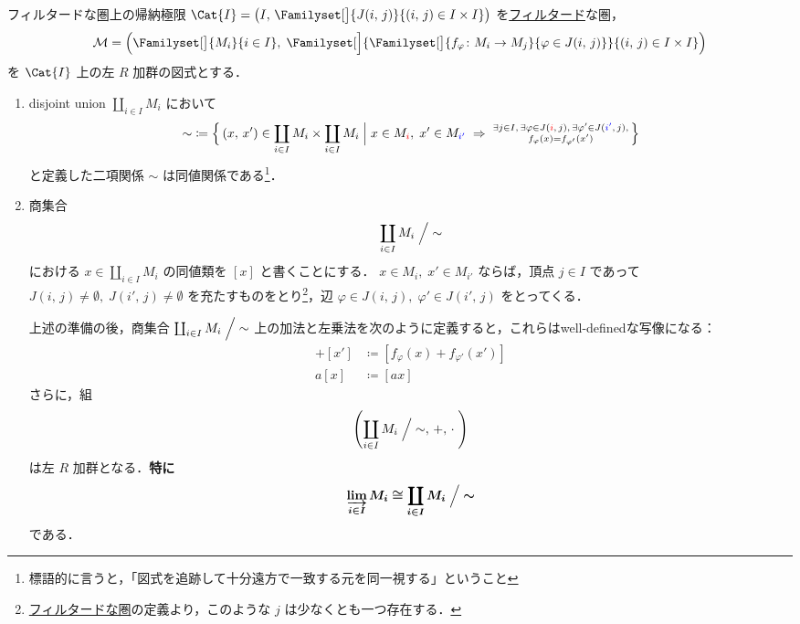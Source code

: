 \documentclass[algtopo_main]{subfiles}
\begin{document}
\begin{myprop}[label=prop:indlim-f, breakable]{フィルタードな圏上の帰納極限}
	$\Cat{I} = \bigl( I,\, \Familyset[\big]{J(i,\, j)}{(i,\, j) \in I \times I} \bigr) $ を\hyperref[def:filtered]{フィルタード}な圏，
	\begin{align}
		\mathcal{M} = \Bigl( \Familyset[\big]{M_i}{i \in I},\; \Familyset[\Big]{\Familyset[\big]{f_\varphi \colon M_i \to M_j}{\varphi \in J(i,\, j)}}{(i,\, j) \in I \times I} \Bigr)
	\end{align}
	を $\Cat{I}$ 上の左 $R$ 加群の図式とする．
	\begin{enumerate}
		\item disjoint union $\coprod_{i \in I} M_i$ において
		\begin{align}
			\sim \; \coloneqq \Bigl\{\, (x,\, x') \in \coprod_{i \in I} M_i \times \coprod_{i \in I} M_i \Bigm| x \in M_{\textcolor{red}{i}},\; x' \in M_{\textcolor{blue}{i'}}\; \Rightarrow\; \substack{\exists j \in I,\,\exists \varphi \in J(\textcolor{red}{i},\, j),\, \exists \varphi' \in J(\textcolor{blue}{i'},\, j),\\ f_\varphi(x) = f_{\varphi'}(x')} \,\Bigr\} 
		\end{align}
		と定義した二項関係 $\sim$ は同値関係である\footnote{標語的に言うと，「図式を追跡して十分遠方で一致する元を同一視する」ということ}．
		\item 商集合
		\begin{align}
			\coprod_{i \in I} M_i \Bigm/ {\sim}
		\end{align}
		における $x \in \coprod_{i \in I} M_i$ の同値類を $[x]$ と書くことにする．
		$x \in M_i,\; x' \in M_{i'}$ ならば，頂点 $j \in I$ であって $J(i,\, j) \neq \emptyset,\; J(i',\, j) \neq \emptyset$ を充たすものをとり\footnote{\hyperref[def:filtered]{フィルタードな圏}の定義より，このような $j$ は少なくとも一つ存在する．}，辺 $\varphi \in J(i,\, j),\; \varphi' \in J(i',\, j)$ をとってくる．

		上述の準備の後，商集合 $\coprod_{i \in I} M_i \Bigm/ {\sim}$ 上の加法と左乗法を次のように定義すると，これらはwell-definedな写像になる：
		\begin{align}
			[x] + [x'] & \coloneqq [f_\varphi(x) + f_{\varphi'}(x')] \\
			a[x] &\coloneqq [ax]
		\end{align}
		さらに，組
		\begin{align}
			\left( \coprod_{i \in I} M_i \Bigm/ \mathord{\sim},\, +,\, \cdot\mathrel{} \right) 
		\end{align}
		は左 $R$ 加群となる．\textbf{特に}
		\begin{align}
			\bm{\varinjlim_{i \in I} M_i \cong \coprod_{i \in I} M_i \Bigm/ {\sim}}
		\end{align}
		である．
	\end{enumerate}
\end{myprop}
\end{document}
